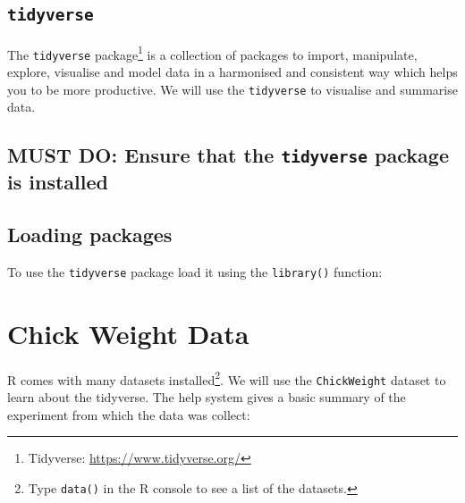 \documentclass[a4paper,9pt,twocolumn,twoside,printwatermark=false]{pinp}
\begin{document}
\subsection{\texorpdfstring{\texttt{tidyverse}}{tidyverse}}\label{tidyverse}

The \texttt{tidyverse} package\footnote{Tidyverse:
  \url{https://www.tidyverse.org/}} is a collection of packages to
import, manipulate, explore, visualise and model data in a harmonised
and consistent way which helps you to be more productive. We will use
the \texttt{tidyverse} to visualise and summarise data.

\subsection{\texorpdfstring{MUST DO: Ensure that the \texttt{tidyverse}
package is
installed}{MUST DO: Ensure that the tidyverse package is installed}}\label{must-do-ensure-that-the-tidyverse-package-is-installed}

\begin{Shaded}
\begin{Highlighting}[]
\NormalTok{(}\NormalTok{)}
\end{Highlighting}
\end{Shaded}

\subsection{Loading packages}\label{loading-packages}

To use the \texttt{tidyverse} package load it using the
\texttt{library()} function:

\begin{Shaded}
\begin{Highlighting}[]
\end{Highlighting}
\end{Shaded}

\section{Chick Weight Data}\label{chick-weight-data}

R comes with many datasets installed\footnote{Type \texttt{data()} in
  the R console to see a list of the datasets.}. We will use the
\texttt{ChickWeight} dataset to learn about the tidyverse. The help
system gives a basic summary of the experiment from which the data was
collect:
\end{document}
